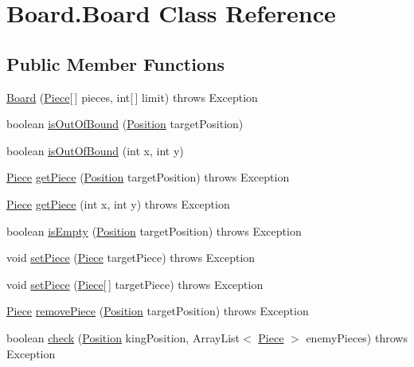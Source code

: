 \hypertarget{classBoard_1_1Board}{\section{Board.\-Board Class Reference}
\label{classBoard_1_1Board}
}
\subsection*{Public Member Functions}
\begin{DoxyCompactItemize}
\item 
\hyperlink{classBoard_1_1Board_a652faf97b9270325dfec42e9878dde03}{Board} (\hyperlink{classPiece_1_1Piece}{Piece}\mbox{[}$\,$\mbox{]} pieces, int\mbox{[}$\,$\mbox{]} limit)  throws Exception 
\item 
boolean \hyperlink{classBoard_1_1Board_aca3851cdb777a92a5cf7d2606f08a0b2}{is\-Out\-Of\-Bound} (\hyperlink{classUtil_1_1Position}{Position} target\-Position)
\item 
boolean \hyperlink{classBoard_1_1Board_aa3a97aabcffb32d0c8d93770002af58a}{is\-Out\-Of\-Bound} (int x, int y)
\item 
\hyperlink{classPiece_1_1Piece}{Piece} \hyperlink{classBoard_1_1Board_a86de1febbcfdc2ea7ccaef4dd00d1d9d}{get\-Piece} (\hyperlink{classUtil_1_1Position}{Position} target\-Position)  throws Exception 
\item 
\hyperlink{classPiece_1_1Piece}{Piece} \hyperlink{classBoard_1_1Board_a98f33996099296400eea798e545174b3}{get\-Piece} (int x, int y)  throws Exception 
\item 
boolean \hyperlink{classBoard_1_1Board_a0cbc00ef5292278d7e1ae004762d3e11}{is\-Empty} (\hyperlink{classUtil_1_1Position}{Position} target\-Position)  throws Exception 
\item 
void \hyperlink{classBoard_1_1Board_aec610c37f3e800806daa464a45b48762}{set\-Piece} (\hyperlink{classPiece_1_1Piece}{Piece} target\-Piece)  throws Exception 
\item 
void \hyperlink{classBoard_1_1Board_ad7f93562756cf2704b53d660d8c2ef12}{set\-Piece} (\hyperlink{classPiece_1_1Piece}{Piece}\mbox{[}$\,$\mbox{]} target\-Piece)  throws Exception 
\item 
\hyperlink{classPiece_1_1Piece}{Piece} \hyperlink{classBoard_1_1Board_a31788b52f6230f37b2c68e274c62f1e7}{remove\-Piece} (\hyperlink{classUtil_1_1Position}{Position} target\-Position)  throws Exception 
\item 
boolean \hyperlink{classBoard_1_1Board_abf4d033c7753e614381a9276ee29fc62}{check} (\hyperlink{classUtil_1_1Position}{Position} king\-Position, Array\-List$<$ \hyperlink{classPiece_1_1Piece}{Piece} $>$ enemy\-Pieces)  throws Exception 

\end{DoxyCompactItemize}
